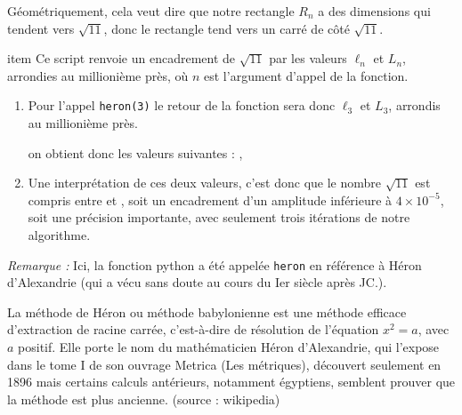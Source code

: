 \begin{enumerate}
Géométriquement, cela veut dire que notre rectangle $R_n$ a des dimensions qui tendent vers $\sqrt{11}$, donc le rectangle tend vers un carré de côté $\sqrt{11}$.

item Ce script renvoie un encadrement de $\sqrt{11}$ par les valeurs $\ell_n$ et $L_n$, arrondies au millionième près, où $n$ est l'argument d'appel de la fonction.

	\begin{enumerate}
		\item Pour l'appel \texttt{heron(3)} le retour de la fonction sera donc $\ell_3$ et $L_3$, arrondis au millionième près.

on obtient donc les valeurs suivantes :  , 

		\item Une interprétation de ces deux valeurs, c'est donc que le nombre $\sqrt{11}$ est compris entre  et , soit un encadrement d'un amplitude inférieure à $4\times 10^{-5}$, soit une précision importante, avec seulement trois itérations de notre algorithme.
		\end{enumerate}

	\end{enumerate}
\emph{Remarque :} Ici, la fonction python a été appelée \texttt{heron} en référence à Héron d'Alexandrie (qui a vécu sans doute au cours du Ier siècle après JC.).

La méthode de Héron ou méthode babylonienne est une méthode efficace d'extraction de racine carrée, c’est-à-dire de résolution de l'équation $x^2 = a$, avec $a$ positif. Elle porte le nom du mathématicien Héron d'Alexandrie, qui l'expose dans le tome I de son ouvrage Metrica (Les métriques), découvert seulement en 1896 mais certains calculs antérieurs, notamment égyptiens, semblent prouver que la méthode est plus ancienne.
\hfill(source : wikipedia)
